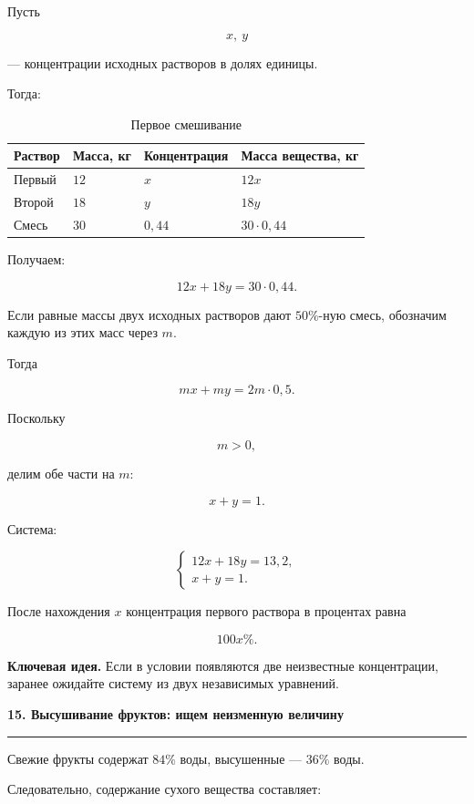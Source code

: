 \documentclass[a4paper,12pt]{article}
\newcommand{\topic}[1]{%
    \vspace{0.5em}
    {\Large\bfseries\textcolor{darkaccent}{#1}}\par
    \vspace{0.2em}
    {\color{accent}\rule{\linewidth}{0.7pt}}
    \vspace{0.5em}
}
\newcommand{\keyidea}[1]{%
    \par\smallskip
    \textbf{\textcolor{darkaccent}{Ключевая идея.}} #1
    \par\smallskip
}
\begin{document}
Пусть

\[
x,\ y
\]

--- концентрации исходных растворов в долях единицы.

Тогда:

\begin{table}[h]
\centering
\caption{Первое смешивание}
\renewcommand{\arraystretch}{1.4}
\begin{tabularx}{0.9\linewidth}{@{}lXXX@{}}
\toprule
Раствор & Масса, кг & Концентрация & Масса вещества, кг \\
\midrule
Первый & \(12\) & \(x\) & \(12x\) \\
Второй & \(18\) & \(y\) & \(18y\) \\
Смесь & \(30\) & \(0{,}44\) & \(30\cdot0{,}44\) \\
\bottomrule
\end{tabularx}
\end{table}

Получаем:

\[
12x+18y=30\cdot0{,}44.
\]

Если равные массы двух исходных растворов дают \(50\%\)-ную смесь, обозначим каждую из этих масс через \(m\).

Тогда

\[
mx+my=2m\cdot0{,}5.
\]

Поскольку

\[
m>0,
\]

делим обе части на \(m\):

\[
x+y=1.
\]

Система:

\[
\boxed{
\begin{cases}
12x+18y=13{,}2,\\
x+y=1.
\end{cases}
}
\]

После нахождения \(x\) концентрация первого раствора в процентах равна

\[
100x\%.
\]

\keyidea{
Если в условии появляются две неизвестные концентрации, заранее ожидайте систему из двух независимых уравнений.
}


\topic{15. Высушивание фруктов: ищем неизменную величину}

Свежие фрукты содержат \(84\%\) воды, высушенные --- \(36\%\) воды.

Следовательно, содержание сухого вещества составляет:
\end{document}
